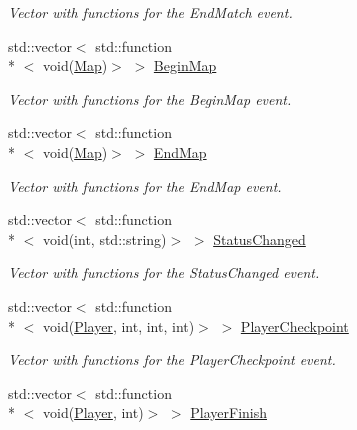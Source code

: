 \begin{DoxyCompactItemize}
\begin{DoxyCompactList}\small\item\em Vector with functions for the End\-Match event. \end{DoxyCompactList}\item 
\hypertarget{classPlugin_a2ba64350d1fcc5269e2f61a0e3725e33}{std\-::vector$<$ std\-::function\\*
$<$ void(\hyperlink{structMap}{Map})$>$ $>$ \hyperlink{classPlugin_a2ba64350d1fcc5269e2f61a0e3725e33}{Begin\-Map}}\label{classPlugin_a2ba64350d1fcc5269e2f61a0e3725e33}

\begin{DoxyCompactList}\small\item\em Vector with functions for the Begin\-Map event. \end{DoxyCompactList}\item 
\hypertarget{classPlugin_ad872750ef7512a9961bc7653a5d8056c}{std\-::vector$<$ std\-::function\\*
$<$ void(\hyperlink{structMap}{Map})$>$ $>$ \hyperlink{classPlugin_ad872750ef7512a9961bc7653a5d8056c}{End\-Map}}\label{classPlugin_ad872750ef7512a9961bc7653a5d8056c}

\begin{DoxyCompactList}\small\item\em Vector with functions for the End\-Map event. \end{DoxyCompactList}\item 
\hypertarget{classPlugin_a1d1a7c5ee8f037cc4277225994829902}{std\-::vector$<$ std\-::function\\*
$<$ void(int, std\-::string)$>$ $>$ \hyperlink{classPlugin_a1d1a7c5ee8f037cc4277225994829902}{Status\-Changed}}\label{classPlugin_a1d1a7c5ee8f037cc4277225994829902}

\begin{DoxyCompactList}\small\item\em Vector with functions for the Status\-Changed event. \end{DoxyCompactList}\item 
\hypertarget{classPlugin_abc2ce0103b7783a4ff4b3009cb18af7b}{std\-::vector$<$ std\-::function\\*
$<$ void(\hyperlink{structPlayer}{Player}, int, int, int)$>$ $>$ \hyperlink{classPlugin_abc2ce0103b7783a4ff4b3009cb18af7b}{Player\-Checkpoint}}\label{classPlugin_abc2ce0103b7783a4ff4b3009cb18af7b}

\begin{DoxyCompactList}\small\item\em Vector with functions for the Player\-Checkpoint event. \end{DoxyCompactList}\item 
\hypertarget{classPlugin_a16aadb48218d18235979314d259699aa}{std\-::vector$<$ std\-::function\\*
$<$ void(\hyperlink{structPlayer}{Player}, int)$>$ $>$ \hyperlink{classPlugin_a16aadb48218d18235979314d259699aa}{Player\-Finish}}\label{classPlugin_a16aadb48218d18235979314d259699aa}


\end{DoxyCompactItemize}
